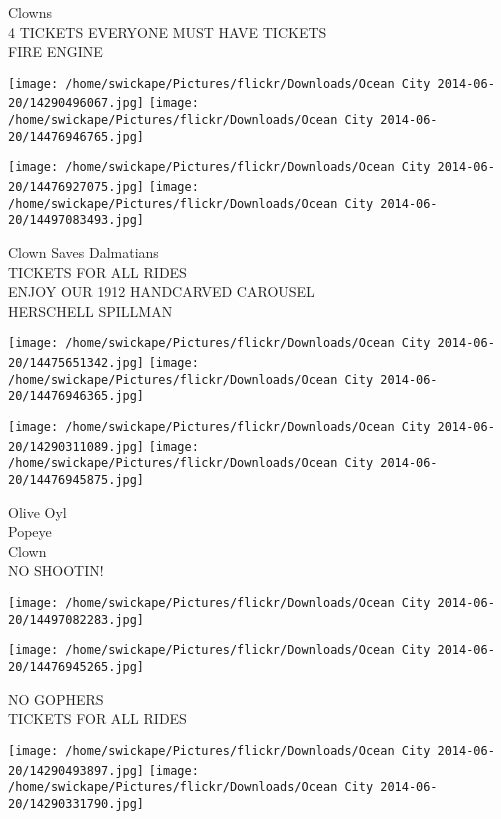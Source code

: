 \documentclass[10pt,letterpaper]{article}
\begin{document}
Clowns\\
4 TICKETS EVERYONE MUST HAVE TICKETS\\
FIRE ENGINE\\
\pagebreak

\texttt{[image: /home/swickape/Pictures/flickr/Downloads/Ocean City 2014-06-20/14290496067.jpg]}
\texttt{[image: /home/swickape/Pictures/flickr/Downloads/Ocean City 2014-06-20/14476946765.jpg]}

\texttt{[image: /home/swickape/Pictures/flickr/Downloads/Ocean City 2014-06-20/14476927075.jpg]}
\texttt{[image: /home/swickape/Pictures/flickr/Downloads/Ocean City 2014-06-20/14497083493.jpg]}

Clown Saves Dalmatians\\
TICKETS FOR ALL RIDES\\
ENJOY OUR 1912 HANDCARVED CAROUSEL\\
HERSCHELL SPILLMAN\\
\pagebreak

\texttt{[image: /home/swickape/Pictures/flickr/Downloads/Ocean City 2014-06-20/14475651342.jpg]}
\texttt{[image: /home/swickape/Pictures/flickr/Downloads/Ocean City 2014-06-20/14476946365.jpg]}

\texttt{[image: /home/swickape/Pictures/flickr/Downloads/Ocean City 2014-06-20/14290311089.jpg]}
\texttt{[image: /home/swickape/Pictures/flickr/Downloads/Ocean City 2014-06-20/14476945875.jpg]}

Olive Oyl\\
Popeye\\
Clown\\
NO SHOOTIN!\\
\pagebreak

\texttt{[image: /home/swickape/Pictures/flickr/Downloads/Ocean City 2014-06-20/14497082283.jpg]}

\vspace{0.25in}
\texttt{[image: /home/swickape/Pictures/flickr/Downloads/Ocean City 2014-06-20/14476945265.jpg]}

NO GOPHERS\\
TICKETS FOR ALL RIDES\\
\pagebreak

\texttt{[image: /home/swickape/Pictures/flickr/Downloads/Ocean City 2014-06-20/14290493897.jpg]}
\texttt{[image: /home/swickape/Pictures/flickr/Downloads/Ocean City 2014-06-20/14290331790.jpg]}
\end{document}
